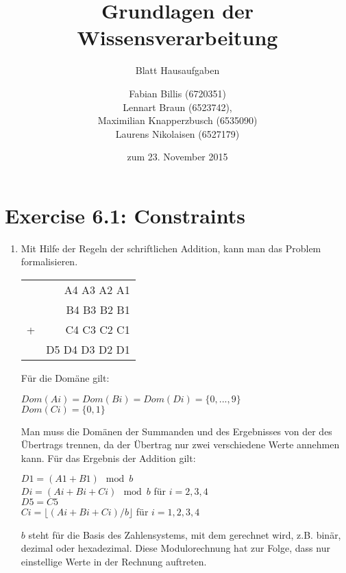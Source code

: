 \documentclass[a4paper]{scrartcl}
\title{Grundlagen der Wissensverarbeitung}
\subtitle{Blatt {\blattnr} Hausaufgaben}
\author{
    Fabian Billis (6720351) \\
    Lennart Braun (6523742), \\
    Maximilian Knapperzbusch (6535090) \\
    Laurens Nikolaisen (6527179) \\
}
\date{zum 23. November 2015}
\def \blattnr {6}
\begin{document}
\maketitle

\section*{Exercise \blattnr.1: Constraints}
\begin{enumerate}
	\item
	Mit Hilfe der Regeln der schriftlichen Addition, kann man das Problem formalisieren. \\
	\begin{center}
		\begin{tabular}{cr}
				&A4 A3 A2 A1 \\
				&B4 B3 B2 B1 \\
				+& C4 C3 C2 C1    \\\hline
				&D5 D4 D3 D2 D1   
		\end{tabular}
	\end{center}
	Für die Domäne gilt: \\
	\begin{center}
	$Dom(Ai) = Dom(Bi) = Dom(Di) = \{0,...,9\}$ \\
	$Dom(Ci) = \{0,1\}$ \\
	\end{center}
	Man muss die Domänen der Summanden und des Ergebnisses von der des Übertrags trennen, da der Übertrag 
	nur zwei verschiedene Werte annehmen kann. Für das Ergebnis der Addition gilt: \\
	\begin{center}
	$D1 = (A1 + B1)\mod b$ \\
	$Di = (Ai + Bi + Ci)\mod b$  für $i = 2,3,4$\\
	$D5 = C5$ \\
	$Ci = \lfloor(Ai + Bi + Ci) / b\rfloor$ für $i = 1,2,3,4$ \\
	\end{center}
	$b$ steht für die Basis des Zahlensystems, mit dem gerechnet wird, z.B. binär, dezimal oder 
	hexadezimal. Diese Modulorechnung hat zur Folge, dass nur einstellige Werte in der Rechnung auftreten.
	
	
	
	   
			
\end{enumerate}
\end{document}
